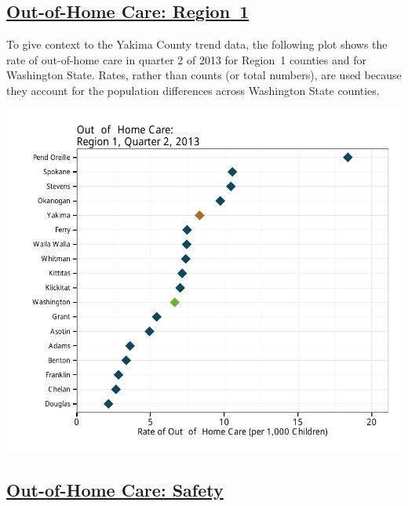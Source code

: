 \documentclass{article}\usepackage[]{graphicx}\usepackage[]{color}
\makeatletter
\def\maxwidth{ %
  \ifdim\Gin@nat@width>\linewidth
    \linewidth
  \else
    \Gin@nat@width
  \fi
}
\newenvironment{knitrout}{}{} %
\makeatother
\begin{document}
\begin{minipage}{\textwidth}
\subsection{\href{http://www.partnersforourchildren.org/child-well-being/visualizations/out-home-care/trends}
    {Out-of-Home Care: Region~1}
}
To give context to the Yakima County trend data, the following plot shows the rate of out-of-home care in quarter 2 of 2013 for Region~1 counties and for Washington State. Rates, rather than counts (or total numbers), are used because they account for the population differences across Washington State counties.\\[1pt]
\begin{knitrout}
\color{fgcolor}

{\centering \includegraphics[width=\maxwidth]{figure/ooh_context} 

}



\end{knitrout}

\end{minipage}
\newpage

\subsection{\href{http://www.partnersforourchildren.org/child-well-being/visualizations/out-home-care/safety}
    {Out-of-Home Care: Safety}
}
\end{document}
